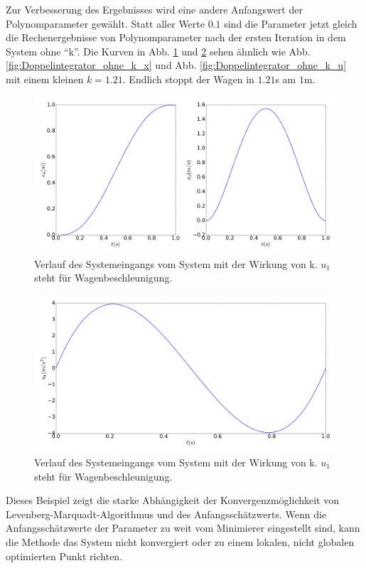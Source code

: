 \begin{beispiel}[Doppelintegrator]
	Zur Verbesserung des Ergebnisses wird eine andere Anfangswert der Polynomparameter gewählt. Statt aller Werte $0.1$ sind die Parameter jetzt gleich die Rechenergebnisse von Polynomparameter nach der ersten Iteration in dem System ohne ``k''. Die Kurven in Abb. \ref{fig:Doppelintegrator_mit_k_x_aus} und \ref{fig:Doppelintegrator_mit_k_u_aus} sehen ähnlich wie Abb. \ref{fig:Doppelintegrator_ohne_k_x} und Abb.  \ref{fig:Doppelintegrator_ohne_k_u} mit einem kleinen $k=1.21$. Endlich stoppt der Wagen in $1.21$s am $1$m. 
	\begin{figure}
		\centering
		\includegraphics[width=15.5cm]{bild/30_32/test0_mit_k_Ite1_x.pdf}
		\caption{Verlauf des Systemeingangs vom System mit der Wirkung von k. $u_{1}$ steht für Wagenbeschleunigung.}
		\label{fig:Doppelintegrator_mit_k_x_aus}
	\end{figure}

	\begin{figure}
		\centering
		\includegraphics[width=12cm]{bild/30_32/test0_mit_k_Ite1_u.pdf}
		\caption{Verlauf des Systemeingangs vom System mit der Wirkung von k. $u_{1}$ steht für Wagenbeschleunigung.}
		\label{fig:Doppelintegrator_mit_k_u_aus}
	\end{figure}
	
\end{beispiel}
\newpage
Dieses Beispiel zeigt die starke Abhängigkeit der Konvergenzmöglichkeit von Levenberg-Marquadt-Algorithmus und des Anfangsschätzwerts. Wenn die Anfangsschätzwerte der Parameter zu weit vom Minimierer eingestellt sind, kann die Methode das System nicht konvergiert oder zu einem lokalen, nicht globalen optimierten Punkt richten.

